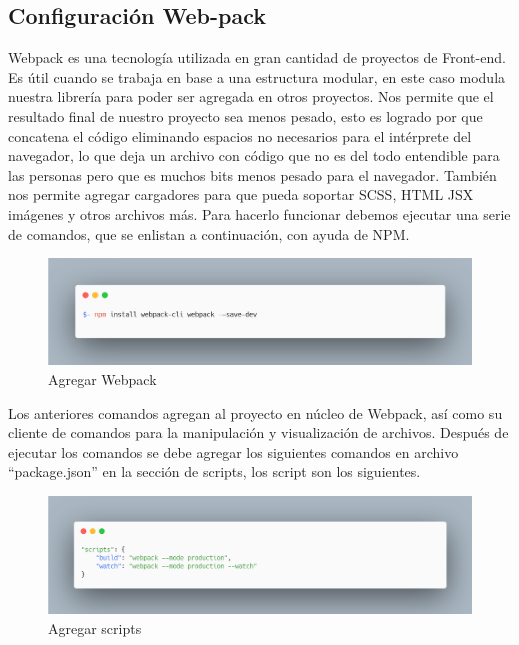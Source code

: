     \subsection{Configuración Web-pack}
    Webpack es una tecnología utilizada en gran cantidad de proyectos de Front-end. Es útil cuando se trabaja en base a una estructura modular, en este caso modula nuestra librería para poder ser agregada en otros proyectos. Nos permite que el resultado final de nuestro proyecto sea menos pesado, esto es logrado por que concatena el código eliminando espacios no necesarios para el intérprete del navegador, lo que deja un archivo con código que no es del todo entendible para las personas pero que es muchos bits menos pesado para el navegador.
    También nos permite agregar cargadores para que pueda soportar SCSS, HTML JSX imágenes y otros archivos más.
    Para hacerlo funcionar debemos ejecutar una serie de comandos, que se enlistan a continuación, con ayuda de NPM.
    \newline
    \newline
     \begin{figure}[H]
    \includegraphics[width=1\textwidth]{./Imagenes/image3.png}
     \caption[Agregar Webpack]{Agregar Webpack}
         \end{figure}
    \newline
    \newline
    Los anteriores comandos agregan al proyecto en núcleo de Webpack, así como su cliente de comandos para la manipulación y visualización de archivos. Después de ejecutar los comandos se debe agregar los siguientes comandos en archivo “package.json”  en la sección de scripts, los script son los siguientes.
    \newline
    \newline
     \begin{figure}[H]
    \includegraphics[width=1\textwidth]{./Imagenes/image6.png}
     \caption[Agregar scripts]{Agregar scripts}
         \end{figure}
